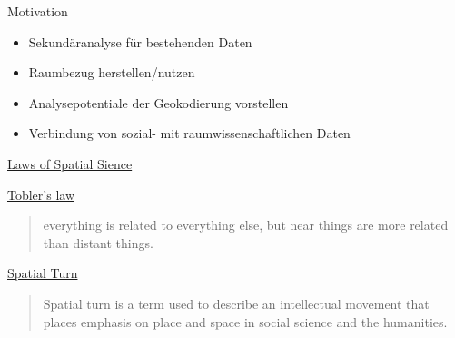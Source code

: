 \documentclass[ignorenonframetext,]{beamer}
\providecommand{\tightlist}{%
  \setlength{\itemsep}{0pt}\setlength{\parskip}{0pt}}
\begin{document}
\begin{frame}{Motivation}

\begin{itemize}
\tightlist
\item
  Sekundäranalyse für bestehenden Daten
\item
  Raumbezug herstellen/nutzen
\item
  Analysepotentiale der Geokodierung vorstellen
\item
  Verbindung von sozial- mit raumwissenschaftlichen Daten
\end{itemize}

\end{frame}

\begin{frame}{\href{http://de.slideshare.net/rheimann04/big-social-data-the-spatial-turn-in-big-data}{Laws
of Spatial Sience}}

\begin{block}{\href{https://en.wikipedia.org/wiki/Tobler's_first_law_of_geography}{Tobler's
law}}

\begin{quote}
everything is related to everything else, but near things are more
related than distant things.
\end{quote}

\end{block}

\begin{block}{\href{https://de.wikipedia.org/wiki/Spatial_turn}{Spatial
Turn}}

\begin{quote}
Spatial turn is a term used to describe an intellectual movement that
places emphasis on place and space in social science and the humanities.
\end{quote}

\end{block}

\end{frame}
\end{document}
